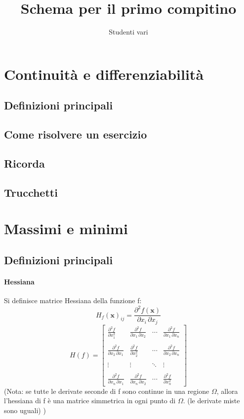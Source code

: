 \documentclass[a4paper,10pt]{book}
\author{Studenti vari}
\title{Schema per il primo compitino}
\begin{document}
\maketitle

\section{Continuità e differenziabilità}
\subsection{Definizioni principali}

\subsection{Come risolvere un esercizio}

\subsection{Ricorda}
\subsection{Trucchetti}

\section{Massimi e minimi}
\subsection{Definizioni principali}

\paragraph{Hessiana}
Si definisce matrice Hessiana della funzione f:
$$  H_{f}(\mathbf{x})_{ij} = \frac{\partial^2 f(\mathbf{x})}{\partial x_i\, \partial x_j} $$
$$ H(f) = \begin{bmatrix} \frac{\partial^2 f}{\partial x_1^2} & \frac{\partial^2 f}{\partial x_1\,\partial x_2} & \cdots & \frac{\partial^2 f}{\partial x_1\,\partial x_n} \\ \\ \frac{\partial^2 f}{\partial x_2\,\partial x_1} & \frac{\partial^2 f}{\partial x_2^2} & \cdots & \frac{\partial^2 f}{\partial x_2\,\partial x_n} \\ \\ \vdots & \vdots & \ddots & \vdots \\ \\ \frac{\partial^2 f}{\partial x_n\,\partial x_1} & \frac{\partial^2 f}{\partial x_n\,\partial x_2} & \cdots & \frac{\partial^2 f}{\partial x_n^2} \end{bmatrix}$$
(Nota: se tutte le derivate seconde di f sono continue in una regione $\Omega$, allora l'hessiana di f è una matrice simmetrica in ogni punto di $\Omega$. (le derivate miste sono uguali) )
\end{document}
